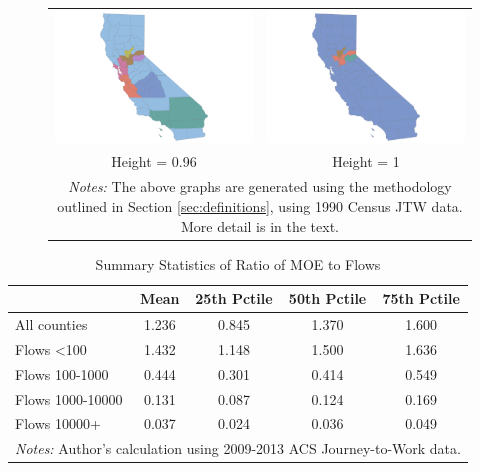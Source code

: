 \begin{figure}[th]
\begin{tabular}{cc}
\includegraphics[scale=0.1]{./figures/insetmaps/california_clustermap_960_inset6.png} & \includegraphics[scale=0.1]{./figures/insetmaps/california_clustermap_1000_inset6.png} \\
Height = 0.96 & Height = 1\\
\multicolumn{2}{p{5in}}{\footnotesize \emph{Notes:} The above graphs are generated using the methodology outlined in Section \ref{sec:definitions}, using 1990 Census JTW data. More detail is in the text.}
\end{tabular}
\end{figure}

\begin{table}[h]
\caption{Summary Statistics of Ratio of MOE to Flows \label{tab:moesum}}
\begin{tabular}{lcccc}
\hline\hline
& Mean & 25th Pctile & 50th Pctile & 75th Pctile \\
\hline
All counties & 1.236 & 0.845 & 1.370 & 1.600\\
Flows <100 & 1.432 & 1.148 & 1.500 & 1.636 \\
Flows 100-1000 & 0.444 & 0.301 & 0.414 & 0.549  \\
Flows 1000-10000 & 0.131 & 0.087 & 0.124 & 0.169 \\
Flows 10000+ & 0.037 & 0.024 & 0.036 & 0.049 \\
\hline\hline
\multicolumn{5}{p{4in}}{\footnotesize \emph{Notes:} Author's calculation using
2009-2013 ACS Journey-to-Work data.}
\end{tabular}
\end{table}
